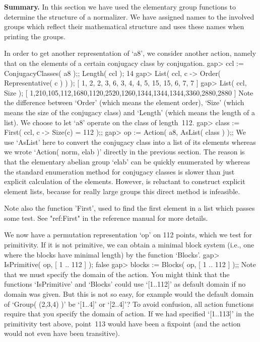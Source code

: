 {\bf Summary.}   In  this section   we have   used   the elementary group
functions to determine  the structure of  a normalizer. We have  assigned
names  to the involved groups which  reflect their mathematical structure
and {\GAP} uses these names when printing the groups.


In  order to get  another  representation  of  `a8', we consider  another
action, namely  that on  the elements   of a  certain conjugacy  class by
conjugation.
\beginexample
gap> ccl := ConjugacyClasses( a8 );; Length( ccl );
14
gap> List( ccl, c -> Order( Representative( c ) ) );
[ 1, 2, 2, 3, 6, 3, 4, 4, 5, 15, 15, 6, 7, 7 ]
gap> List( ccl, Size );
[ 1,210,105,112,1680,1120,2520,1260,1344,1344,1344,3360,2880,2880 ]
\endexample
Note  the  difference between `Order'  (which   means the element order),
`Size' (which means the size of the conjugacy  class) and `Length' (which
means the length of  a list). We choose to  let `a8' operate on the class
of length~112.
\beginexample
gap> class := First( ccl, c -> Size(c) = 112 );;
gap> op := Action( a8, AsList( class ) );;
\endexample
We use `AsList' here  to convert the conjugacy class  into a list  of its
elements whereas we   wrote  `Action( norm,  elab )'   directly in the
previous section. The reason is that  the elementary abelian group `elab'
can  be quickly enumerated by   {\GAP}  whereas the standard  enumeration
method for conjugacy classes is  slower than just explicit calculation of
the elements. However, {\GAP} is reluctant  to construct explicit element
lists, because for really large groups this direct method is infeasible.

Note also  the function 'First', used to  find the  first element in a
list which  passes some test. See  "ref:First" in the reference manual
for more details.

We now have a permutation representation `op' on 112 points, which we
test for primitivity. If it is not primitive, we can obtain a minimal
block system (i.e., one where the blocks have minimal length) by the
function `Blocks'.
\beginexample
gap> IsPrimitive( op, [ 1 .. 112 ] );
false
gap> blocks := Blocks( op, [ 1 .. 112 ] );;
\endexample
Note that we  must specify the domain  of the action. You  might think
that the   functions `IsPrimitive' and `Blocks'  could  use `[1..112]' as
default  domain if no  domain was  given. But  this  is not so  easy, for
example  would the default domain  of `Group(  (2,3,4)  )' be `[1..4]' or
`[2..4]'? To  avoid confusion, all action  functions  require that you
specify  the domain of action. If  we had specified  `[1..113]' in the
primitivity test above,  point~113  would have been  a fixpoint  (and the
action would not even have been transitive).

